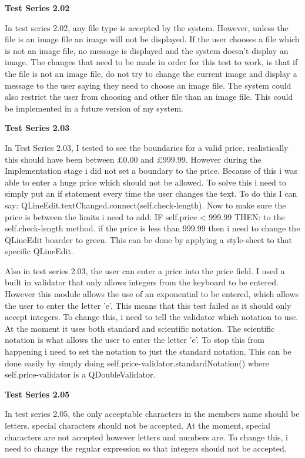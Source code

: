 \textbf{Test Series 2.02}

In test series 2.02, any file type is accepted by the system. However, unless the file is an image file an image will not be displayed. If the user chooses a file which is not an image file, no message is displayed and the system doesn't display an image. The changes that need to be made in order for this test to work, is that if the file is not an image file, do not try to change the current image and display a message to the user saying they need to choose an image file. The system could also restrict the user from choosing and other file than an image file. This could be implemented in a future version of my system.

\textbf{Test Series 2.03}

In Test Series 2.03, I tested to see the boundaries for a valid price. realistically this should have been between £0.00 and £999.99. However during the Implementation stage i did not set a boundary to the price. Because of this i was able to enter a huge price which should not be allowed. To solve this i need to simply put an if statement every time the user changes the text. To do this I can say: QLineEdit.textChanged.connect(self.check-length). Now to make sure the price is between the limits i need to add: IF self.price < 999.99 THEN: to the self.check-length method. if the price is less than 999.99 then i need to change the QLineEdit boarder to green. This can be done by applying a style-sheet to that specific QLineEdit.

Also in test series 2.03, the user can enter a price into the price field. I used a built in validator that only allows integers from the keyboard to be entered. However this module allows the use of an exponential to be entered, which allows the user to enter the letter 'e'. This means that this test failed as it should only accept integers. To change this, i need to tell the validator which notation to use. At the moment it uses both standard and scientific notation. The scientific notation is what allows the user to enter the letter 'e'. To stop this from happening i need to set the notation to just the standard notation. This can be done easily by simply doing self.price-validator.standardNotation() where self.price-validator is a QDoubleValidator.

\textbf{Test Series 2.05}

In test series 2.05, the only acceptable characters in the members name should be letters. special characters should not be accepted. At the moment, special characters are not accepted however letters and numbers are. To change this, i need to change the regular expression so that integers should not be accepted.

